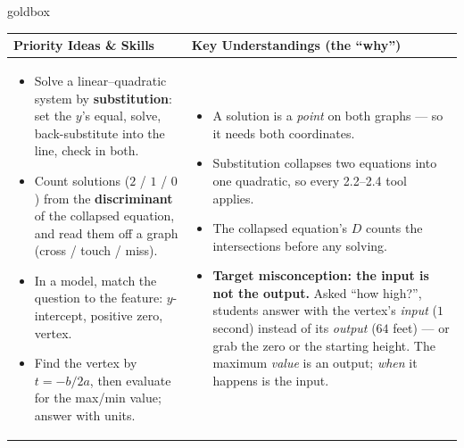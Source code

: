\documentclass[10pt]{article}
\begin{document}
\renewcommand{\arraystretch}{1.4}
\begin{skillbox}{goldbox}
\begin{tabularx}{\linewidth}{@{}X|X@{}}
\textbf{Priority Ideas \& Skills} & \textbf{Key Understandings (the ``why'')} \\[2pt]
\hline
\vspace{-6pt}
\begin{itemize}[leftmargin=1.1em, nosep, after=\vspace{2pt}]
  \item Solve a linear--quadratic system by \textbf{substitution}: set the $y$'s equal, solve,
        back-substitute into the line, check in both.
  \item Count solutions ($2$ / $1$ / $0$) from the \textbf{discriminant} of the collapsed
        equation, and read them off a graph (cross / touch / miss).
  \item In a model, match the question to the feature: $y$-intercept, positive zero, vertex.
  \item Find the vertex by $t=-b/2a$, then evaluate for the max/min value; answer with units.
\end{itemize}
&
\vspace{-6pt}
\begin{itemize}[leftmargin=1.1em, nosep, after=\vspace{2pt}]
  \item A solution is a \emph{point} on both graphs --- so it needs both coordinates.
  \item Substitution collapses two equations into one quadratic, so every 2.2--2.4 tool applies.
  \item The collapsed equation's $D$ counts the intersections before any solving.
  \item \textbf{Target misconception: the input is not the output.} Asked ``how high?'',
        students answer with the vertex's \emph{input} ($1$ second) instead of its
        \emph{output} ($64$ feet) --- or grab the zero or the starting height. The maximum
        \emph{value} is an output; \emph{when} it happens is the input.
\end{itemize}
\end{tabularx}
\end{skillbox}
\end{document}
